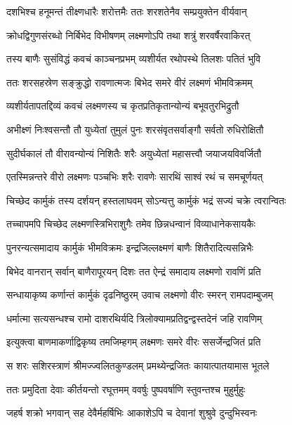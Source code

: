 \twolineshloka
{दशभिश्च हनूमन्तं तीक्ष्णधारैः शरोत्तमैः}
{ततः शरशतेनैव सम्प्रयुक्तेन वीर्यवान्} %

\twolineshloka
{क्रोधद्विगुणसंरब्धो निर्बिभेद विभीषणम्}
{लक्ष्मणोऽपि तथा शत्रुं शरवर्षैरवाकिरत्} %

\twolineshloka
{तस्य बाणैः सुसंविद्धं कवचं काञ्चनप्रभम्}
{व्यशीर्यत रथोपस्थे तिलशः पतितं भुवि} %

\twolineshloka
{ततः शरसहस्रेण सङ्क्रुद्धो रावणात्मजः}
{बिभेद समरे वीरं लक्ष्मणं भीमविक्रमम्} %

\twolineshloka
{व्यशीर्यतापतद्दिव्यं कवचं लक्ष्मणस्य च}
{कृतप्रतिकृतान्योन्यं बभूवतुरभिद्रुतौ} %

\twolineshloka
{अभीक्ष्णं निःश्वसन्तौ तौ युध्येतां तुमुलं पुनः}
{शरसंवृतसर्वाङ्गौ सर्वतो रुधिरोक्षितौ} %

\twolineshloka
{सुदीर्घकालं तौ वीरावन्योन्यं निशितैः शरैः}
{अयुध्येतां महासत्त्वौ जयाजयविवर्जितौ} %

\twolineshloka
{एतस्मिन्नन्तरे वीरो लक्ष्मणः पञ्चभिः शरैः}
{रावणेः सारथिं साश्वं रथं च समचूर्णयत्} %

\twolineshloka
{चिच्छेद कार्मुकं तस्य दर्शयन् हस्तलाघवम्}
{सोऽन्यत्तु कार्मुकं भद्रं सज्यं चक्रे त्वरान्वितः} %

\twolineshloka
{तच्चापमपि चिच्छेद लक्ष्मणस्त्रिभिराशुगैः}
{तमेव छिन्नधन्वानं विव्याधानेकसायकैः} %

\twolineshloka
{पुनरन्यत्समादाय कार्मुकं भीमविक्रमः}
{इन्द्रजिल्लक्ष्मणं बाणैः शितैरादित्यसन्निभैः} %

\twolineshloka
{बिभेद वानरान् सर्वान् बाणैरापूरयन् दिशः}
{तत ऐन्द्रं समादाय लक्ष्मणो रावणिं प्रति} %

\twolineshloka
{सन्धायाकृष्य कर्णान्तं कार्मुकं दृढनिष्ठुरम्}
{उवाच लक्ष्मणो वीरः स्मरन् रामपदाम्बुजम्} %

\twolineshloka
{धर्मात्मा सत्यसन्धश्च रामो दाशरथिर्यदि}
{त्रिलोक्यामप्रतिद्वन्द्वस्तदेनं जहि रावणिम्} %

\twolineshloka
{इत्युक्त्वा बाणमाकर्णाद्विकृष्य तमजिम्हगम्}
{लक्ष्मणः समरे वीरः ससर्जेन्द्रजितं प्रति} %

\twolineshloka
{स शरः सशिरस्त्राणं श्रीमज्ज्वलितकुण्डलम्}
{प्रमथ्येन्द्रजितः कायात्पातयामास भूतले} %

\twolineshloka
{ततः प्रमुदिता देवाः कीर्तयन्तो रघूत्तमम्}
{ववर्षुः पुष्पवर्षाणि स्तुवन्तश्च मुहुर्मुहुः} %

\twolineshloka
{जहर्ष शक्रो भगवान् सह देवैर्महर्षिभिः}
{आकाशेऽपि च देवानां शुश्रुवे दुन्दुभिस्वनः} %

